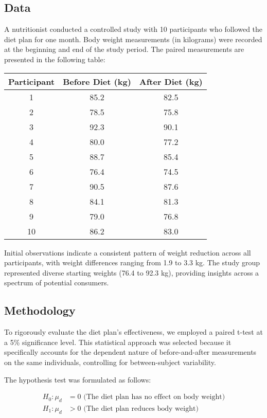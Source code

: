 \documentclass[12pt]{article}
\begin{document}
\subsection{Data}
A nutritionist conducted a controlled study with 10 participants who followed the diet plan for one month. Body weight measurements (in kilograms) were recorded at the beginning and end of the study period. The paired measurements are presented in the following table:

\begin{center}
\begin{tabular}{|c|c|c|}
\hline
\textbf{Participant} & \textbf{Before Diet (kg)} & \textbf{After Diet (kg)} \\
\hline
1 & 85.2 & 82.5 \\
2 & 78.5 & 75.8 \\
3 & 92.3 & 90.1 \\
4 & 80.0 & 77.2 \\
5 & 88.7 & 85.4 \\
6 & 76.4 & 74.5 \\
7 & 90.5 & 87.6 \\
8 & 84.1 & 81.3 \\
9 & 79.0 & 76.8 \\
10 & 86.2 & 83.0 \\
\hline
\end{tabular}
\end{center}

\noindent Initial observations indicate a consistent pattern of weight reduction across all participants, with weight differences ranging from 1.9 to 3.3 kg. The study group represented diverse starting weights (76.4 to 92.3 kg), providing insights across a spectrum of potential consumers.

\subsection{Methodology}
To rigorously evaluate the diet plan's effectiveness, we employed a paired t-test at a 5\% significance level. This statistical approach was selected because it specifically accounts for the dependent nature of before-and-after measurements on the same individuals, controlling for between-subject variability.

The hypothesis test was formulated as follows:

\begin{align}
H_0: \mu_d &= 0 \text{ (The diet plan has no effect on body weight)} \\
H_1: \mu_d &> 0 \text{ (The diet plan reduces body weight)}
\end{align}
\end{document}
